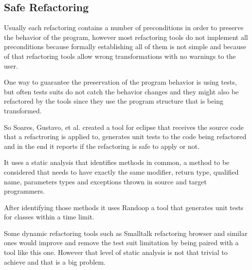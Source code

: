 
\subsection{Safe Refactoring}

Usually each refactoring contains a number of preconditions in order to preserve the behavior of the program, however most refactoring tools do not implement all preconditions because formally establishing all of them is not simple and because of that refactoring tools allow wrong transformations with no warnings to the user.

One way to guarantee the preservation of the program behavior is using tests, but often tests suits do not catch the behavior changes and they might also be refactored by the tools since they use the program structure that is being transformed.

So Soares, Gustavo, et al. \cite{soares2010making} created a tool for eclipse that receives the source code that a refactroring is applied to, generates unit tests to the code being refactored and in the end it reports if the refactoring is safe to apply or not.

It uses a static analysis that identifies methods in common, a method to be considered that needs to have exactly the same modifier, return type, qualified name, parameters types and exceptions thrown in source and target programmers.

After identifying those methods it uses Randoop \cite{pacheco2007feedback} %
 a tool that generates unit tests for classes within a time limit.

Some dynamic refactoring tools such as Smalltalk refactoring browser and similar ones would improve and remove the test suit limitation by being paired with a tool like this one. However that level of static analysis is not that trivial to achieve and that is a big problem. %